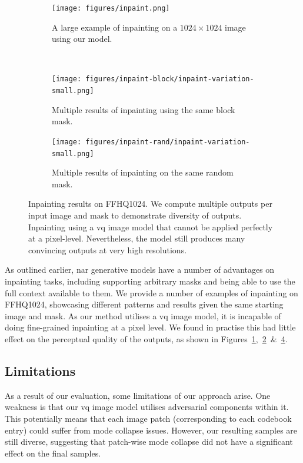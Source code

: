 \begin{figure}[h]
    \centering
    \begin{subfigure}[b]{\textwidth}
        \centering
        \texttt{[image: figures/inpaint.png]}
        \caption{A large example of inpainting on a $1024 \times 1024$ image using our
        model.}
        \label{fig:inpaintExample}
    \end{subfigure}
    \\
    \begin{subfigure}[b]{0.47\textwidth}
        \centering
        \texttt{[image: figures/inpaint-block/inpaint-variation-small.png]}
        \caption{
            Multiple results of inpainting using the same block mask.
        }
        \label{fig:inpaintBlock}
    \end{subfigure}
    \hfill
    \begin{subfigure}[b]{0.47\textwidth}
        \centering
        \texttt{[image: figures/inpaint-rand/inpaint-variation-small.png]}
        \caption{
            Multiple results of inpainting on the same random mask. 
        }
        \label{fig:inpaintRandom}
    \end{subfigure}
    \caption{
        Inpainting results on FFHQ1024. We compute multiple outputs per input
        image and mask to demonstrate diversity of outputs. Inpainting using a
        \gls{vq} image model that cannot be applied perfectly at a pixel-level.
        Nevertheless, the model still produces many convincing outputs at very
        high resolutions.
    }
\end{figure}

As outlined earlier, \acrlong{nar} generative models have a number of advantages
on inpainting tasks, including supporting arbitrary masks and being able to use
the full context available to them. We provide a number of examples of
inpainting on FFHQ1024, showcasing different patterns and results given the same
starting image and mask. As our method utilises a \gls{vq} image model, it is
incapable of doing fine-grained inpainting at a pixel level. We found in
practise this had little effect on the perceptual quality of the outputs, as
shown in Figures~\ref{fig:inpaintExample},~\ref{fig:inpaintBlock}~\&~\ref{fig:inpaintRandom}.

\subsection{Limitations}
\label{subsec:evaluationLimitation}

As a result of our evaluation, some limitations of our approach arise. One
weakness is that our \gls{vq} image model utilises adversarial components
within it. This potentially means that each image patch (corresponding to each
codebook entry) could suffer from mode collapse issues. However, our
resulting samples are still diverse, suggesting that patch-wise mode collapse
did not have a significant effect on the final samples.

